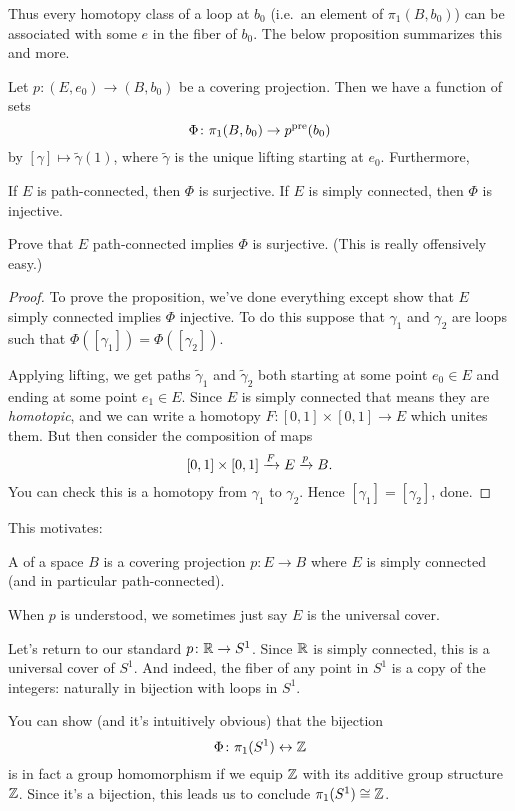 Thus every homotopy class of a loop at $b_0$ (i.e.\ an element of $\pi_1(B, b_0)$) can be associated with some $e$ in the fiber of $b_0$.
The below proposition summarizes this and more.
\begin{proposition}
	Let $p \colon (E,e_0) \to (B,b_0)$ be a covering projection.
	Then we have a function of sets
	\[ \Phi \colon \pi_1(B, b_0) \to p^{\text{pre}}(b_0) \]
	by $[\gamma] \mapsto \tilde\gamma(1)$, where $\tilde\gamma$
	is the unique lifting starting at $e_0$.
	Furthermore,
	\begin{itemize}
		\ii If $E$ is path-connected, then $\Phi$ is surjective.
		\ii If $E$ is simply connected, then $\Phi$ is injective.
	\end{itemize}
\end{proposition}
\begin{ques}
	Prove that $E$ path-connected implies $\Phi$ is surjective.
	(This is really offensively easy.)
\end{ques}
\begin{proof}
	To prove the proposition, we've done everything except show
	that $E$ simply connected implies $\Phi$ injective.
	To do this suppose that $\gamma_1$ and $\gamma_2$ are loops
	such that $\Phi([\gamma_1]) = \Phi([\gamma_2])$.

	Applying lifting, we get paths $\tilde\gamma_1$ and $\tilde\gamma_2$
	both starting at some point $e_0 \in E$ and ending at some point $e_1 \in E$.
	Since $E$ is simply connected that means they are \emph{homotopic},
	and we can write a homotopy $F \colon [0,1] \times [0,1] \to E$
	which unites them.
	But then consider the composition of maps
	\[ [0,1] \times [0,1] \xrightarrow{F} E \xrightarrow{p} B. \]
	You can check this is a homotopy from $\gamma_1$ to $\gamma_2$.
	Hence $[\gamma_1] = [\gamma_2]$, done.
\end{proof}

This motivates:
\begin{definition}
	A  of a space $B$ is a covering projection
	$p \colon E \to B$ where $E$ is simply connected (and in particular path-connected).
\end{definition}
\begin{abuse}
	When $p$ is understood, we sometimes just say $E$ is the universal cover.
\end{abuse}

\begin{example}
	Let's return to our standard $p \colon \mathbb R \to S^1$.
	Since $\mathbb R$ is simply connected, this is a universal cover of $S^1$.
	And indeed, the fiber of any point in $S^1$
	is a copy of the integers: naturally in bijection with loops in $S^1$.

	You can show (and it's intuitively obvious) that the bijection
	\[ \Phi \colon \pi_1(S^1) \leftrightarrow \mathbb Z \]
	is in fact a group homomorphism if we equip $\mathbb Z$ with its
	additive group structure $\mathbb Z$.
	Since it's a bijection, this leads us to conclude $\pi_1(S^1) \cong \mathbb Z$.
\end{example}

